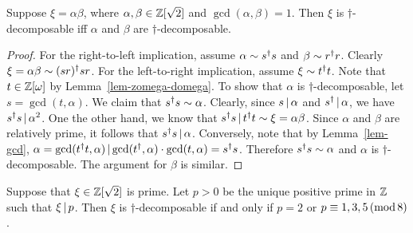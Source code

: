 \begin{lemma}\label{lem-alpha-beta}
  Suppose $\xi=\alpha\beta$, where $\alpha,\beta\in\mathbb{Z}[\sqrt2]$ and
  $\gcd(\alpha,\beta)=1$. Then $\xi$ is $\dagger$-decomposable iff
  $\alpha$ and $\beta$ are $\dagger$-decomposable.
\end{lemma}

\begin{proof}
  For the right-to-left implication, assume $\alpha\sim s^{\dagger} s$ and
  $\beta\sim r^{\dagger} r$. Clearly $\xi=\alpha\beta\sim (sr)^{\dagger} sr$. For
  the left-to-right implication, assume $\xi\sim t^{\dagger} t$. Note that
  $t\in\mathbb{Z}[\omega]$ by Lemma~\ref{lem-zomega-domega}. To show that
  $\alpha$ is $\dagger$-decomposable, let $s=\gcd(t, \alpha)$.  We
  claim that $s^{\dagger} s\sim\alpha$. Clearly, since $s\mathop{|}\nolimits\alpha$ and
  $s^{\dagger}\mathop{|}\nolimits\alpha$, we have $s^{\dagger} s\mathop{|}\nolimits \alpha^2$. One the
  other hand, we know that $s^{\dagger} s\mathop{|}\nolimits t^{\dagger} t \sim
  \xi=\alpha\beta$. Since $\alpha$ and $\beta$ are relatively prime,
  it follows that $s^{\dagger} s\mathop{|}\nolimits \alpha$. Conversely, note that by
  Lemma~\ref{lem-gcd}, $\alpha = \gcd(t^{\dagger} t,\alpha) \mathop{|}\nolimits
  \gcd(t^{\dagger},\alpha)\cdot \gcd(t,\alpha) = s^{\dagger} s$. Therefore $s^{\dagger}
  s\sim\alpha$ and $\alpha$ is $\dagger$-decomposable. The argument
  for $\beta$ is similar.
\end{proof}

\begin{lemma}\label{lem-1235}
  Suppose that $\xi\in\mathbb{Z}[\sqrt2]$ is prime. Let $p>0$ be the unique
  positive prime in $\mathbb{Z}$ such that $\xi\mathop{|}\nolimits p$. Then $\xi$ is
  $\dagger$-decomposable if and only if $p=2$ or $p\equiv
  1,3,5\,(\mathop{{\rm mod}}8)$.
\end{lemma}

